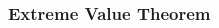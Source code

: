 \documentclass[cal1spr16Lectures.tex]{subfiles}
\begin{document}
\begin{frame}
\frametitle{}
\begin{columns}%
\begin{column}{.5\textwidth}
\begin{block}{}
\end{block}
\end{column}
\begin{column}{.5\textwidth}
\begin{block}{}
\end{block}
\end{column}
\end{columns}
\end{frame}

\subsubsection{Extreme Value Theorem}
\end{document}
